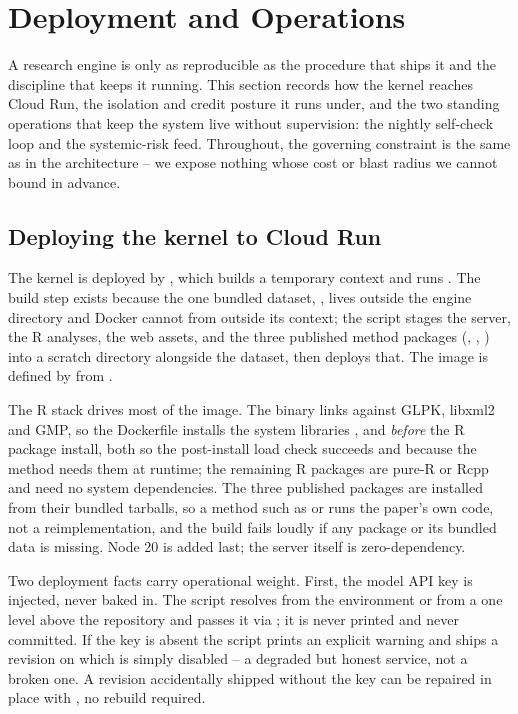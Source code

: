 \section{Deployment and Operations}
\label{sec:deployment-ops}

A research engine is only as reproducible as the procedure that ships it and the
discipline that keeps it running. This section records how the kernel reaches Cloud
Run, the isolation and credit posture it runs under, and the two standing
operations that keep the system live without supervision: the nightly self-check
loop and the systemic-risk feed. Throughout, the governing constraint is the same
as in the architecture -- we expose nothing whose cost or blast radius we cannot
bound in advance.

\subsection{Deploying the kernel to Cloud Run}
\label{sec:deploy}

The kernel is deployed by , which builds a temporary
context and runs . The build step exists because
the one bundled dataset, , lives outside the engine directory and
Docker cannot  from outside its context; the script stages the server,
the R analyses, the web assets, and the three published method packages
(, , ) into a scratch
directory alongside the dataset, then deploys that. The image is defined by
 from .

The R stack drives most of the image. The  binary links against GLPK,
libxml2 and GMP, so the Dockerfile installs the system libraries
,  and  \emph{before} the R package
install, both so the post-install load check succeeds and because the method needs
them at runtime; the remaining R packages are pure-R or Rcpp and need no system
dependencies. The three published packages are installed from their bundled
tarballs, so a method such as  or 
runs the paper's own code, not a reimplementation, and the build fails loudly if any
package or its bundled data is missing. Node 20 is added last; the server itself is
zero-dependency.

Two deployment facts carry operational weight. First, the model API key is injected,
never baked in. The script resolves  from the environment or
from a  one level above the repository and passes it via
; it is never printed and never committed. If the key is
absent the script prints an explicit warning and ships a revision on which
 is simply disabled -- a degraded but honest service, not a broken
one. A revision accidentally shipped without the key can be repaired in place with
, no rebuild required.

